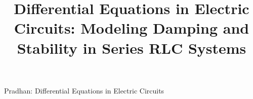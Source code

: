 \title{Differential Equations in Electric Circuits: Modeling Damping and Stability in Series RLC Systems}

\author{
}

%
{Pradhan: Differential Equations in Electric Circuits}

\maketitle
